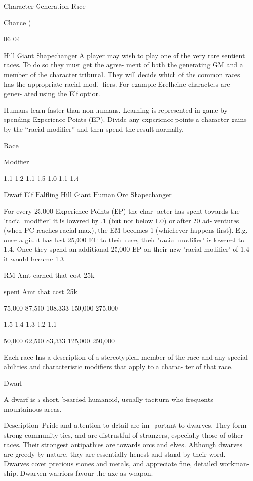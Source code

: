 \begin{Chapter}{Character Generation}
Race 

Chance (%

06 
04 

Hill Giant 
Shapechanger 
A  player  may  wish  to  play  one  of  the  very  rare 
sentient  races.  To  do  so  they  must  get  the  agree-
ment of both the generating GM and a member of 
the  character  tribunal.  They  will  decide  which  of 
the common races has the appropriate racial modi-
fiers.  For  example  Erelheine  characters  are  gener-
ated using the Elf option. 

Humans learn faster than non-humans. Learning is 
represented in game by spending Experience Points 
(EP).  Divide  any  experience  points  a  character 
gains  by  the  “racial  modifier”  and  then  spend  the 
result normally. 

Race 

Modifier 

1.1 
1.2 
1.1 
1.5 
1.0 
1.1 
1.4 

Dwarf 
Elf 
Halfling 
Hill Giant 
Human 
Orc 
Shapechanger 
 
For every 25,000 Experience Points (EP) the char-
acter  has  spent  towards  the  'racial  modifier'  it  is 
lowered  by  .1  (but  not  below  1.0)  or  after  20  ad-
ventures  (when  PC  reaches  racial  max),  the  EM 
becomes  1  (whichever  happens  first).  E.g.  once  a 
giant  has  lost  25,000  EP to  their  race,  their  'racial 
modifier'  is  lowered  to  1.4.  Once  they  spend  an 
additional 25,000 EP on their new 'racial modifier' 
of 1.4 it would become 1.3. 

RM   Amt  earned  
that cost 25k  

spent  
Amt 
that cost 25k  

75,000  
87,500  
108,333  
150,000 
275,000  

1.5  
1.4  
1.3  
1.2  
1.1  
 

50,000  
62,500  
83,333  
125,000  
250,000 

Each  race  has  a  description  of  a  stereotypical 
member of the race and any special abilities and 
characteristic  modifiers  that  apply  to  a  charac-
ter of that race. 

Dwarf 

A  dwarf  is  a  short,  bearded  humanoid,  usually 
taciturn who frequents mountainous areas. 

Description:  Pride  and  attention  to  detail  are  im-
portant  to  dwarves.  They  form  strong  community 
ties,  and  are  distrustful  of  strangers,  especially 
those of other races. Their strongest antipathies are 
towards  orcs  and  elves.  Although  dwarves  are 
greedy  by  nature,  they  are  essentially  honest  and 
stand by their word. Dwarves covet precious stones 
and metals, and appreciate fine, detailed workman-
ship. Dwarven warriors favour the axe as weapon. 


\end{Chapter}
